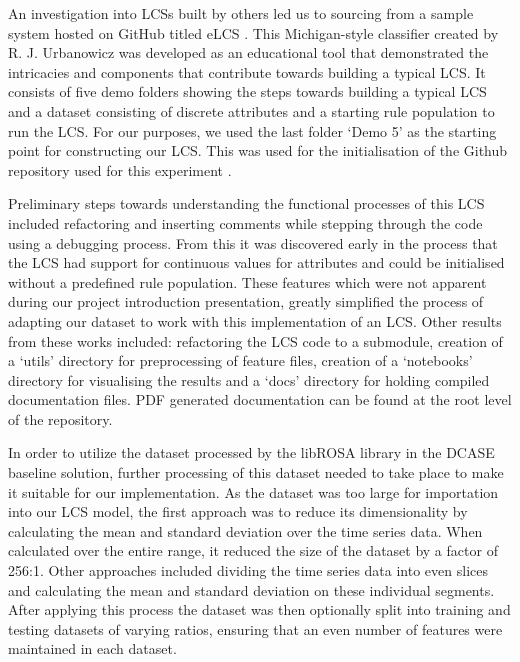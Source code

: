 \documentclass[11pt]{article}
\begin{document}
An investigation into LCSs built by others led us to sourcing from a sample system hosted on GitHub titled eLCS \cite{GHRUELCS2016}. This Michigan-style classifier created by R. J. Urbanowicz was developed as an educational tool that demonstrated the intricacies and components that contribute towards building a typical LCS. It consists of five demo folders showing the steps towards building a typical LCS and a dataset consisting of discrete attributes and a starting rule population to run the LCS. For our purposes, we used the last folder `Demo 5' as the starting point for constructing our LCS. This was used for the initialisation of the Github repository used for this experiment \cite{GHSMCITS44042017}.

Preliminary steps towards understanding the functional processes of this LCS included refactoring and inserting comments while stepping through the code using a debugging process. From this it was discovered early in the process that the LCS had support for continuous values for attributes and could be initialised without a predefined rule population. These features which were not apparent during our project introduction presentation, greatly simplified the process of adapting our dataset to work with this implementation of an LCS. Other results from these works included: refactoring the LCS code to a submodule, creation of a `utils' directory for preprocessing of feature files, creation of a `notebooks' directory for visualising the results and a `docs' directory for holding compiled documentation files. PDF generated documentation can be found at the root level of the repository.

In order to utilize the dataset processed by the libROSA library in the DCASE baseline solution, further processing of this dataset needed to take place to make it suitable for our implementation. As the dataset was too large for importation into our LCS model, the first approach was to reduce its dimensionality by calculating the mean and standard deviation over the time series data. When calculated over the entire range, it reduced the size of the dataset by a factor of 256:1. Other approaches included dividing the time series data into even slices and calculating the mean and standard deviation on these individual segments. After applying this process the dataset was then optionally split into training and testing datasets of varying ratios, ensuring that an even number of features were maintained in each dataset.
\end{document}
